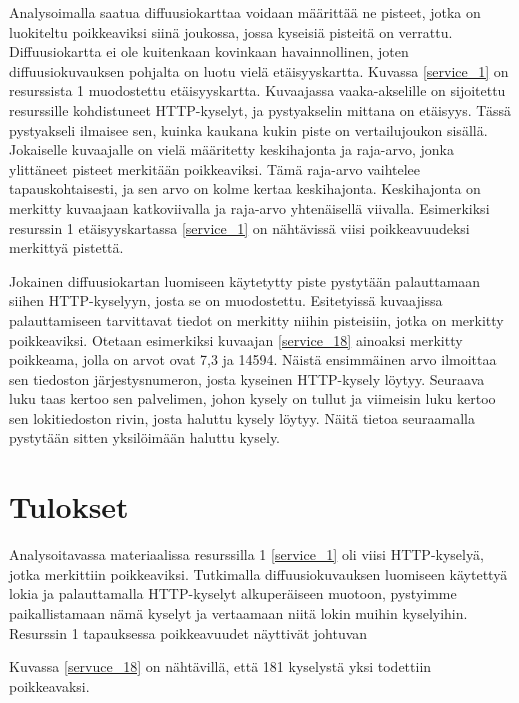 Analysoimalla saatua diffuusiokarttaa voidaan määrittää ne pisteet, jotka on luokiteltu poikkeaviksi siinä joukossa, jossa kyseisiä pisteitä on 
verrattu. Diffuusiokartta ei ole kuitenkaan kovinkaan havainnollinen, joten diffuusiokuvauksen pohjalta on luotu vielä etäisyyskartta. Kuvassa
\ref{service_1} on resurssista 1 muodostettu etäisyyskartta. Kuvaajassa vaaka-akselille on sijoitettu resurssille kohdistuneet HTTP-kyselyt,
ja pystyakselin mittana on etäisyys. Tässä pystyakseli ilmaisee sen, kuinka kaukana kukin piste on vertailujoukon sisällä. Jokaiselle kuvaajalle
on vielä määritetty keskihajonta ja raja-arvo, jonka ylittäneet pisteet merkitään poikkeaviksi. Tämä raja-arvo vaihtelee tapauskohtaisesti, ja sen
arvo on kolme kertaa keskihajonta. Keskihajonta on merkitty kuvaajaan katkoviivalla ja raja-arvo yhtenäisellä viivalla. Esimerkiksi resurssin 1 
etäisyyskartassa \ref{service_1} on nähtävissä viisi poikkeavuudeksi merkittyä pistettä.

Jokainen diffuusiokartan luomiseen käytetytty piste pystytään palauttamaan siihen HTTP-kyselyyn, josta se on muodostettu. Esitetyissä kuvaajissa
palauttamiseen tarvittavat tiedot on merkitty niihin pisteisiin, jotka on merkitty poikkeaviksi. Otetaan esimerkiksi kuvaajan \ref{service_18}
ainoaksi merkitty poikkeama, jolla on arvot ovat 7,3 ja 14594. Näistä ensimmäinen arvo ilmoittaa sen tiedoston järjestysnumeron, josta kyseinen 
HTTP-kysely löytyy. Seuraava luku taas kertoo sen palvelimen, johon kysely on tullut ja viimeisin luku kertoo sen lokitiedoston rivin, josta
haluttu kysely löytyy. Näitä tietoa seuraamalla pystytään sitten yksilöimään haluttu kysely.
   
\section{Tulokset}

Analysoitavassa materiaalissa resurssilla 1 \ref{service_1} oli viisi HTTP-kyselyä, jotka merkittiin poikkeaviksi. Tutkimalla diffuusiokuvauksen
luomiseen käytettyä lokia ja palauttamalla HTTP-kyselyt alkuperäiseen muotoon, pystyimme paikallistamaan nämä kyselyt ja vertaamaan niitä lokin
muihin kyselyihin. Resurssin 1 tapauksessa poikkeavuudet näyttivät johtuvan 

Kuvassa \ref{servuce_18} on nähtävillä, että 181 kyselystä yksi todettiin poikkeavaksi. 

